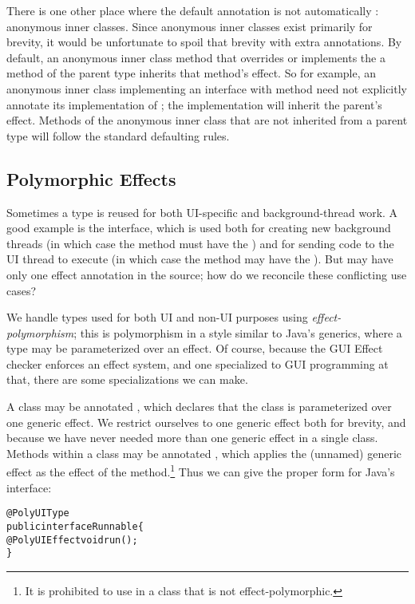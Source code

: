 There is one other place where the default annotation is not automatically :
anonymous inner classes.  Since anonymous inner classes exist primarily for brevity, it would be
unfortunate to spoil that brevity with extra annotations.  By default, an anonymous inner class
method that overrides or implements the a method of the parent type inherits that method's effect.
So for example, an anonymous inner class implementing an interface with method  need not explicitly annotate its implementation of ; the implementation will inherit
the parent's effect.  Methods of the anonymous inner class that are not inherited from a parent type
will follow the standard defaulting rules.

\subsection{Polymorphic Effects\label{guieffects-poly}}
Sometimes a type is reused for both UI-specific and background-thread work.  A good example is the
 interface, which is used both for creating new background threads (in which case the
 method must have the ) and for sending code to the UI thread to
execute (in which case the  method may have the ).  But
 may have only one effect annotation in the source; how do we reconcile these
conflicting use cases?

We handle types used for both UI and non-UI purposes using \emph{effect-polymorphism}; this is
polymorphism in a style similar to Java's generics, where a type may be parameterized over an
effect.  Of course, because the GUI Effect checker enforces an effect system, and one specialized to
GUI programming at that, there are some specializations we can make.

A class may be annotated , which declares that the class is parameterized over one
generic effect.  We restrict ourselves to one generic effect both for brevity, and because we have
never needed more than one generic effect in a single class.  Methods within a 
class may be annotated , which applies the (unnamed) generic effect as the
effect of the method.\footnote{It is prohibited to use  in a class that is not
effect-polymorphic.}  Thus we can give the proper form for Java's  interface:

\begin{alltt}
@PolyUIType
public interface Runnable \{
    @PolyUIEffect void run();
\}
\end{alltt}

